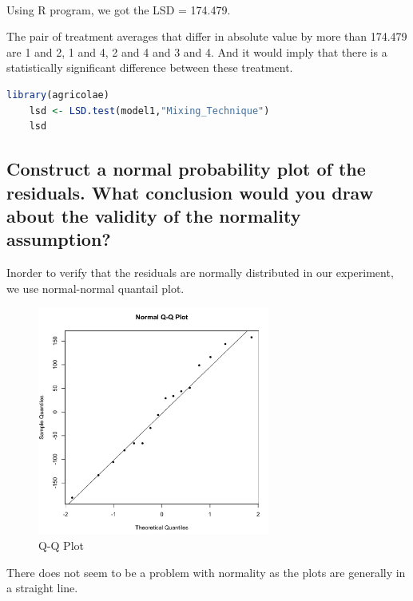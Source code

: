 \documentclass[11pt]{article}
\begin{document}
\paragraph{}
Using R program, we got the LSD = 174.479.

The pair of treatment averages that differ in absolute value by more than 174.479 are {1 and 2}, {1 and 4}, {2 and 4} and {3 and 4}.
And it would imply that there is a statistically significant difference between these treatment.

\clearpage

\begin{lstlisting}[language=R]
    library(agricolae)
    lsd <- LSD.test(model1,"Mixing_Technique")
    lsd
\end{lstlisting}



   
\clearpage

\subsection{Construct a normal probability plot of the residuals. What conclusion would you draw about the validity of the normality assumption?}

Inorder to verify that the residuals are normally distributed in our experiment, we use
normal-normal quantail plot. 


\begin{figure}[H]
    \centering
    \includegraphics[width=3.0in]{../pictures/hw2_q1_qqplot.png}
    \caption{Q-Q Plot}
    \label{Q-Q Plot}
\end{figure}

There does not seem to be a problem with normality as the plots are generally in a straight line.
\end{document}
